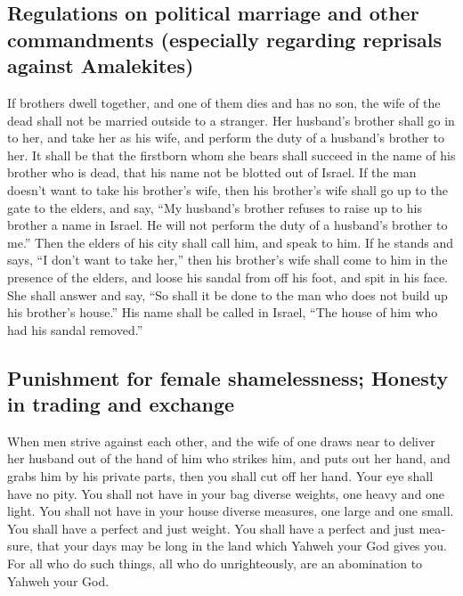 \begin{paracol}{2}
\begin{otherlanguage}{english}
\hypertarget{regulations-on-political-marriage-and-other-commandments-especially-regarding-reprisals-against-amalekites}{%
\subsection{Regulations on political marriage and other commandments
(especially regarding reprisals against
Amalekites)}\label{regulations-on-political-marriage-and-other-commandments-especially-regarding-reprisals-against-amalekites}}

 If brothers dwell together, and one of them dies and has
no son, the wife of the dead shall not be married outside to a stranger.
Her husband's brother shall go in to her, and take her as his wife, and
perform the duty of a husband's brother to her.  It shall
be that the firstborn whom she bears shall succeed in the name of his
brother who is dead, that his name not be blotted out of Israel.
 If the man doesn't want to take his brother's wife, then
his brother's wife shall go up to the gate to the elders, and say, ``My
husband's brother refuses to raise up to his brother a name in Israel.
He will not perform the duty of a husband's brother to me.''
 Then the elders of his city shall call him, and speak to
him. If he stands and says, ``I don't want to take her,'' 
then his brother's wife shall come to him in the presence of the elders,
and loose his sandal from off his foot, and spit in his face. She shall
answer and say, ``So shall it be done to the man who does not build up
his brother's house.''  His name shall be called in
Israel, ``The house of him who had his sandal removed.''

\hypertarget{punishment-for-female-shamelessness-honesty-in-trading-and-exchange}{%
\subsection{Punishment for female shamelessness; Honesty in trading and
exchange}\label{punishment-for-female-shamelessness-honesty-in-trading-and-exchange}}

 When men strive against each other, and the wife of one
draws near to deliver her husband out of the hand of him who strikes
him, and puts out her hand, and grabs him by his private parts,
 then you shall cut off her hand. Your eye shall have no
pity.  You shall not have in your bag diverse weights,
one heavy and one light.  You shall not have in your
house diverse measures, one large and one small.  You
shall have a perfect and just weight. You shall have a perfect and just
measure, that your days may be long in the land which Yahweh your God
gives you.  For all who do such things, all who do
unrighteously, are an abomination to Yahweh your God.


\end{otherlanguage}
\end{paracol}
